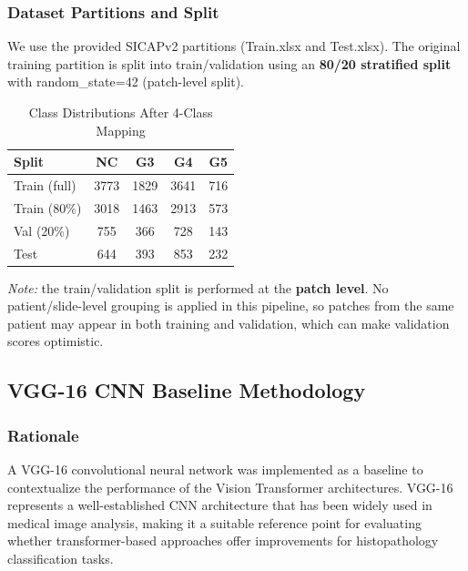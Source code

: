 \documentclass[conference]{IEEEtran}
\begin{document}
\subsubsection{\textbf{Dataset Partitions and Split}}
We use the provided SICAPv2 partitions (Train.xlsx and Test.xlsx). The original training partition is split into train/validation using an \textbf{80/20 stratified split} with random\_state=42 (patch-level split).

\begin{table}[!htb]
\caption{Class Distributions After 4-Class Mapping}
\label{tab:vit_class_counts}
\centering
\begin{tabular}{lcccc}
\hline
\textbf{Split} & \textbf{NC} & \textbf{G3} & \textbf{G4} & \textbf{G5} \\
\hline
Train (full) & 3773 & 1829 & 3641 & 716 \\
Train (80\%) & 3018 & 1463 & 2913 & 573 \\
Val (20\%)   & 755  & 366  & 728  & 143 \\
Test         & 644  & 393  & 853  & 232 \\
\hline
\end{tabular}
\end{table}

\textit{Note:} the train/validation split is performed at the \textbf{patch level}. No patient/slide-level grouping is applied in this pipeline, so patches from the same patient may appear in both training and validation, which can make validation scores optimistic.

\subsection{\textbf{VGG-16 CNN Baseline Methodology}}

\subsubsection{\textbf{Rationale}}
A VGG-16 convolutional neural network was implemented as a baseline to contextualize the performance of the Vision Transformer architectures. VGG-16 represents a well-established CNN architecture that has been widely used in medical image analysis, making it a suitable reference point for evaluating whether transformer-based approaches offer improvements for histopathology classification tasks.

\end{document}
